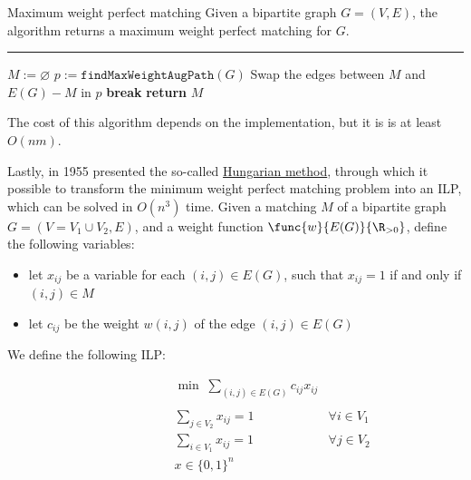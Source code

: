 \documentclass[a4paper, 12pt]{report}
\begin{document}
    \begin{framedalgo}{Maximum weight perfect matching}
        Given a bipartite graph $G = (V, E)$, the algorithm returns a maximum weight perfect matching for $G$. \\
        \hrule

        \quad
        \begin{algorithmic}[1]
                \State $M := \varnothing$
                \Do
                    \State $p := \texttt{findMaxWeightAugPath}(G)$ 
                        \State Swap the edges between $M$ and $E(G) - M$ in $p$
                    \Else
                        \State \textbf{break}
                    \EndIf
                \State \textbf{return} $M$
            \EndFunction
        \end{algorithmic}
    \end{framedalgo}

    The cost of this algorithm depends on the implementation, but it is is at least $O(n m)$.

    Lastly, in 1955 \textcite{kuhn} presented the so-called \href{https://en.wikipedia.org/wiki/Hungarian_algorithm}{Hungarian method}, through which it possible to transform the minimum weight perfect matching problem into an ILP, which can be solved in $O(n^3)$ time. Given a matching $M$ of a bipartite graph $G = (V = V_1 \cup V_2, E)$, and a weight function $\func{w}{E(G)}{\R_{>0}}$, define the following variables:

    \begin{itemize}
        \item let $x_{ij}$ be a variable for each $(i, j) \in E(G)$, such that $x_{ij} = 1$ if and only if $(i, j) \in M$
        \item let $c_{ij}$ be the weight $w(i, j)$ of the edge $(i, j) \in E(G)$
    \end{itemize}

    We define the following ILP:

    \[\begin{array}{ccc}
        \qquad\qquad\quad
        & \min \; \sum\limits_{(i, j) \in E(G)} {c_{ij}x_{ij}} \\\\
        & \sum\limits_{j \in V_2} {x_{ij}} = 1 & \forall i \in V_1 \\
        & \sum\limits_{i \in V_1} {x_{ij}} = 1 & \forall j \in V_2 \\
        & x \in \{0,1\}^n
    \end{array}\]
\end{document}
